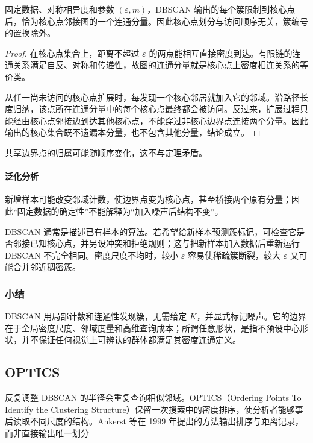 \begin{theorem}
 \label{thm:clustering-dbscan}
 固定数据、对称相异度和参数 $(\varepsilon,m)$，DBSCAN 输出的每个簇限制到核心点后，恰为核心点邻接图的一个连通分量。因此核心点划分与访问顺序无关，簇编号的置换除外。
\end{theorem}
\begin{proof}
在核心点集合上，距离不超过 $\varepsilon$ 的两点能相互直接密度到达。有限链的连通关系满足自反、对称和传递性，故图的连通分量就是核心点上密度相连关系的等价类。

从任一尚未访问的核心点扩展时，每发现一个核心邻居就加入它的邻域。沿路径长度归纳，该点所在连通分量中的每个核心点最终都会被访问。反过来，扩展过程只能经由核心点邻接边到达其他核心点，不能穿过非核心边界点连接两个分量。因此输出的核心集合既不遗漏本分量，也不包含其他分量，结论成立。
\end{proof}

共享边界点的归属可能随顺序变化，这不与定理矛盾。

\paragraph{泛化分析}
新增样本可能改变邻域计数，使边界点变为核心点，甚至桥接两个原有分量；因此“固定数据的确定性”不能解释为“加入噪声后结构不变”。

DBSCAN 通常是描述已有样本的算法。若希望给新样本预测簇标记，可检查它是否邻接已知核心点，并另设冲突和拒绝规则；这与把新样本加入数据后重新运行 DBSCAN 不完全相同。密度尺度不均时，较小 $\varepsilon$ 容易使稀疏簇断裂，较大 $\varepsilon$ 又可能合并邻近稠密簇。

\subsubsection{小结}

DBSCAN 用局部计数和连通性发现簇，无需给定 $K$，并显式标记噪声。它的边界在于全局密度尺度、邻域度量和高维查询成本；所谓任意形状，是指不预设中心形状，并不保证任何视觉上可辨认的群体都满足其密度连通定义。

\subsection{OPTICS}
\label{sec:clustering-optics}

反复调整 DBSCAN 的半径会重复查询相似邻域。OPTICS（Ordering Points To Identify the Clustering Structure）保留一次搜索中的密度排序，使分析者能够事后读取不同尺度的结构。Ankerst 等在 1999 年提出的方法输出排序与距离记录，而非直接输出唯一划分

